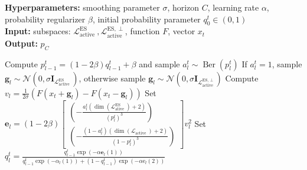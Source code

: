 \begin{algorithm}[h]
\caption{ASEBO subroutine}\label{ASEBO subroutine}

\hspace*{\algorithmicindent} \textbf{Hyperparameters:} smoothing parameter $ \sigma $, horizon $ C $, learning rate $ \alpha $, probability regularizer $ \beta $, initial probability parameter $ q_{0}^{t} \in(0,1) $\\
\hspace*{\algorithmicindent} \textbf{Input:} subspaces: $ \mathcal{L}_{\text {active }}^{\mathrm{ES}}, \mathcal{L}_{\text {active }}^{\mathrm{ES}, \perp} $, function $ F $, vector $ x_{t} $\\
\hspace*{\algorithmicindent} \textbf{Output:} $p_C$
\begin{algorithmic}[1]

    \State Compute $ p_{l-1}^{t}=(1-2 \beta) q_{l-1}^{t}+\beta $ and sample $ a_{l}^{t} \sim \operatorname{Ber}\left(p_{l}^{t}\right) $
    \State If $ a_{l}^{t}=1 $, sample $ \mathbf{g}_{l} \sim \mathcal{N}\left(0, \sigma \mathbf{I}_{\mathcal{L}_{\text {active }}^{\text {ES }}}\right) $, otherwise sample $ \mathbf{g}_{l} \sim \mathcal{N}\left(0, \sigma \mathbf{I}_{ \mathcal{L}_{\text {active }}^{\text{ES, }\perp}}\right) $
    \State Compute $ v_{l}=\frac{1}{2 \sigma}\left(F\left(x_{t}+\mathbf{g}_{l}\right)-F\left(x_{t}-\mathbf{g}_{l}\right)\right) $
    \State Set $ \mathbf{e}_{l}=(1-2 \beta)\left[\begin{array}{c}\left(-\frac{a_{l}^{t}\left(\operatorname{dim}\left(\mathcal{L}_{\text {ative }}^{\mathrm{ES}}\right)+2\right)}{\left(p_{l}^{t}\right)^{3}}\right) \\ \left(-\frac{\left(1-a_{l}^{t}\right)\left(\operatorname{dim}\left(\mathcal{L}_{\text {active }}\right)+2\right)}{\left(1-p_{l}^{t}\right)^{3}}\right)\end{array}\right] v_{l}^{2} $
    \State Set $ q_{l}^{t}=\frac{q_{l-1}^{t} \exp \left(-\alpha \mathbf{e}_{l}(1)\right)}{q_{l-1}^{t} \exp \left(-\alpha_{l}(1)\right)+\left(1-q_{l-1}^{t}\right) \exp \left(-\alpha \mathrm{e}_{l}(2)\right)} $
\EndFor

\end{algorithmic}
\end{algorithm}

